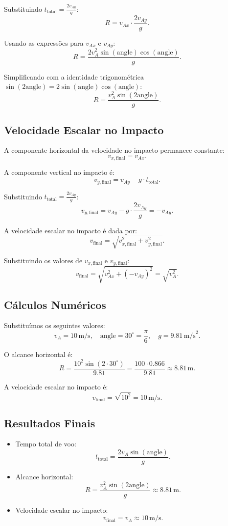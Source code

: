 Substituindo \(t_{\text{total}} = \frac{2 v_{Ay}}{g}\):
\[
R = v_{Ax} \cdot \frac{2 v_{Ay}}{g}.
\]

Usando as expressões para \(v_{Ax}\) e \(v_{Ay}\):
\[
R = \frac{2 v_A^2 \sin(\text{angle}) \cos(\text{angle})}{g}.
\]

Simplificando com a identidade trigonométrica \(\sin(2\text{angle}) = 2 \sin(\text{angle}) \cos(\text{angle})\):
\[
R = \frac{v_A^2 \sin(2\text{angle})}{g}.
\]

\subsection*{Velocidade Escalar no Impacto}
A componente horizontal da velocidade no impacto permanece constante:
\[
v_{x,\text{final}} = v_{Ax}.
\]

A componente vertical no impacto é:
\[
v_{y,\text{final}} = v_{Ay} - g \cdot t_{\text{total}}.
\]

Substituindo \(t_{\text{total}} = \frac{2 v_{Ay}}{g}\):
\[
v_{y,\text{final}} = v_{Ay} - g \cdot \frac{2 v_{Ay}}{g} = -v_{Ay}.
\]

A velocidade escalar no impacto é dada por:
\[
v_{\text{final}} = \sqrt{v_{x,\text{final}}^2 + v_{y,\text{final}}^2}.
\]

Substituindo os valores de \(v_{x,\text{final}}\) e \(v_{y,\text{final}}\):
\[
v_{\text{final}} = \sqrt{v_{Ax}^2 + (-v_{Ay})^2} = \sqrt{v_A^2}.
\]

\subsection*{Cálculos Numéricos}
Substituímos os seguintes valores:
\[
v_A = 10 \, \text{m/s}, \quad \text{angle} = 30^\circ = \frac{\pi}{6}, \quad g = 9.81 \, \text{m/s}^2.
\]

O alcance horizontal é:
\[
R = \frac{10^2 \sin(2 \cdot 30^\circ)}{9.81} = \frac{100 \cdot 0.866}{9.81} \approx 8.81 \, \text{m}.
\]

A velocidade escalar no impacto é:
\[
v_{\text{final}} = \sqrt{10^2} = 10 \, \text{m/s}.
\]

\subsection*{Resultados Finais}
\begin{itemize}
    \item Tempo total de voo:
    \[
    t_{\text{total}} = \frac{2 v_A \sin(\text{angle})}{g}.
    \]
    \item Alcance horizontal:
    \[
    R = \frac{v_A^2 \sin(2\text{angle})}{g} \approx 8.81 \, \text{m}.
    \]
    \item Velocidade escalar no impacto:
    \[
    v_{\text{final}} = v_A \approx 10 \, \text{m/s}.
    \]
\end{itemize}
